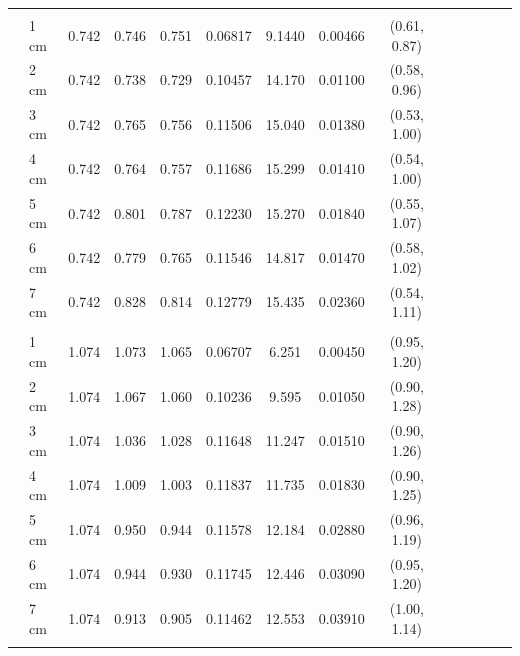 \documentclass[a4paper 12pt]{article}
\numberwithin{equation}{section}
\begin{document}
{\begin{small}
\begin{table}[h!]
\begin{footnotesize}
\begin{tabular}{clclclclclclcl}
 \raisebox{1ex}{\bf age 5}  \\ [1.0ex]
&   1 cm & 0.742 &    0.746 & 0.751 &          0.06817& 9.1440 & 0.00466 & (0.61, 0.87)\\
&   2 cm & 0.742 &    0.738 & 0.729 &          0.10457& 14.170 & 0.01100 & (0.58, 0.96)\\
&   3 cm & 0.742 &    0.765 & 0.756 &          0.11506& 15.040 & 0.01380 & (0.53, 1.00)\\
&   4 cm & 0.742 &    0.764 & 0.757 &          0.11686& 15.299 & 0.01410 & (0.54, 1.00)\\
&   5 cm & 0.742 &    0.801 & 0.787 &          0.12230& 15.270 & 0.01840 & (0.55, 1.07)\\
&   6 cm & 0.742 &    0.779 & 0.765 &          0.11546& 14.817 & 0.01470 & (0.58, 1.02)\\
&   7 cm & 0.742 &    0.828 & 0.814 &          0.12779& 15.435 & 0.02360 & (0.54, 1.11) \\[1.5ex]

 \raisebox{1ex}{\bf age 6+}  \\ [1.0ex]
&   1 cm & 1.074 &    1.073 & 1.065 &          0.06707& 6.251  & 0.00450 & (0.95, 1.20)\\
&   2 cm & 1.074 &    1.067 & 1.060 &          0.10236& 9.595  & 0.01050 & (0.90, 1.28)\\
&   3 cm & 1.074 &    1.036 & 1.028 &          0.11648& 11.247 & 0.01510 & (0.90, 1.26)\\
&   4 cm & 1.074 &    1.009 & 1.003 &          0.11837& 11.735 & 0.01830 & (0.90, 1.25)\\
&   5 cm & 1.074 &    0.950 & 0.944 &          0.11578& 12.184 & 0.02880 & (0.96, 1.19)\\
&   6 cm & 1.074 &    0.944 & 0.930 &          0.11745& 12.446 & 0.03090 & (0.95, 1.20)\\
&   7 cm & 1.074 &    0.913 & 0.905 &          0.11462& 12.553 & 0.03910 & (1.00, 1.14) \\[1.5ex]
  \hline \\
\end{tabular}
\end{footnotesize}
\end{table}
 \end{small}



}
\end{document}
